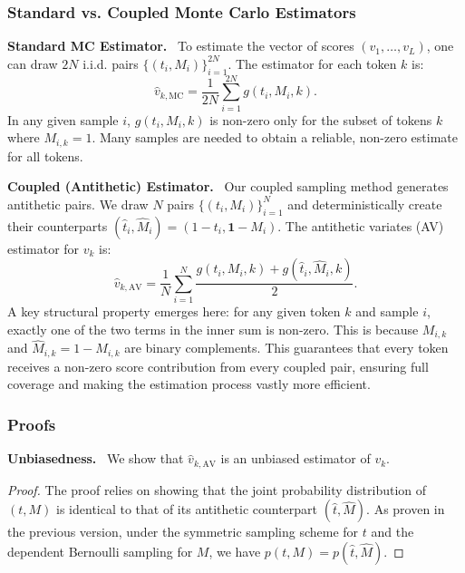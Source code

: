 {  \subsubsection{Standard vs. Coupled Monte Carlo Estimators}
  
  
  \textbf{Standard MC Estimator.}~
  To estimate the vector of scores $(v_1, \dots, v_L)$, one can draw $2N$ i.i.d. pairs $\{(t_i, M_i)\}_{i=1}^{2N}$. The estimator for each token $k$ is:
  \begin{equation}
      \hat{v}_{k, \text{MC}} = \frac{1}{2N} \sum_{i=1}^{2N} g(t_i, M_i, k).
  \end{equation}
  In any given sample $i$, $g(t_i, M_i, k)$ is non-zero only for the subset of tokens $k$ where $M_{i,k}=1$. Many samples are needed to obtain a reliable, non-zero estimate for all tokens.
  
  \textbf{Coupled (Antithetic) Estimator.}~
  Our coupled sampling method generates antithetic pairs. We draw $N$ pairs $\{(t_i, M_i)\}_{i=1}^{N}$ and deterministically create their counterparts $(\hat{t}_i, \hat{M}_i) = (1-t_i, \mathbf{1}-M_i)$. The antithetic variates (AV) estimator for $v_k$ is:
  \begin{equation}
      \hat{v}_{k, \text{AV}} = \frac{1}{N} \sum_{i=1}^{N} \frac{g(t_i, M_i, k) + g(\hat{t}_i, \hat{M}_i, k)}{2}.
  \end{equation}
  A key structural property emerges here: for any given token $k$ and sample $i$, exactly one of the two terms in the inner sum is non-zero. This is because $M_{i,k}$ and $\hat{M}_{i,k} = 1 - M_{i,k}$ are binary complements. This guarantees that every token receives a non-zero score contribution from every coupled pair, ensuring full coverage and making the estimation process vastly more efficient.
  
  \subsubsection{Proofs}
  
  \textbf{Unbiasedness.}~
  We show that $\hat{v}_{k, \text{AV}}$ is an unbiased estimator of $v_k$.
  \begin{proof}
  The proof relies on showing that the joint probability distribution of $(t, M)$ is identical to that of its antithetic counterpart $(\hat{t}, \hat{M})$. 
  As proven in the previous version, under the symmetric sampling scheme for $t$ and the dependent Bernoulli sampling for $M$, we have $p(t,M) = p(\hat{t}, \hat{M})$.
  

\end{proof}}
